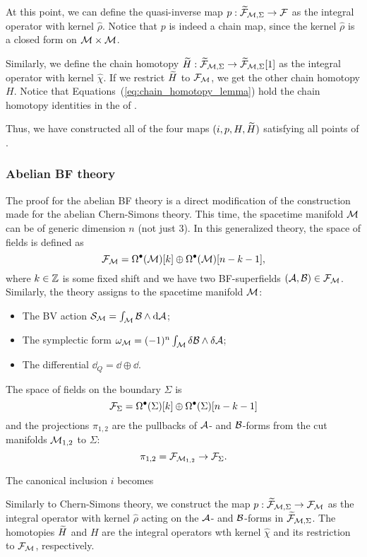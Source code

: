 At this point, we can define the quasi-inverse map $p: \widetilde{\mathcal{F}}_{\mathcal{M}, \Sigma} \rightarrow \mathcal{F}$ as the integral operator with kernel $\hat{\rho}$.
Notice that $p$ is indeed a chain map, since the kernel $\hat{\rho}$ is a closed form on $\mathcal{M} \times \mathcal{M}$.

Similarly, we define the chain homotopy $\widetilde{H} : \widetilde{\mathcal{F}}_{\mathcal{M}, \Sigma} \rightarrow \widetilde{\mathcal{F}}_{\mathcal{M}, \Sigma}[1]$ as the integral operator with kernel $\hat{\chi}$.
If we restrict $\widetilde{H}$ to $\mathcal{F}_{\mathcal{M}}$, we get the other chain homotopy $H$.
Notice that Equations~(\ref{eq:chain_homotopy_lemma}) hold the chain homotopy identities in the  of .

Thus, we have constructed all of the four maps $(i, p, H, \widetilde{H})$ satisfying all points of .

\subsubsection{Abelian BF theory}
\label{subsubsec:abelain_bf_theory}

The proof for the abelian BF theory is a direct modification of the construction made for the abelian Chern-Simons theory.
This time, the spacetime manifold $\mathcal{M}$ can be of generic dimension $n$ (not just 3).
In this generalized theory, the space of fields is defined as
\begin{equation*}
    \mathcal{F}_{\mathcal{M}} = 
    \Omega^\bullet (\mathcal{M})[k] \oplus
    \Omega^\bullet (\mathcal{M})[n-k-1],
\end{equation*}
where $k \in \mathbb{Z}$ is some fixed shift and we have two BF-superfields $(\mathcal{A}, \mathcal{B}) \in \mathcal{F}_{\mathcal{M}}$.
Similarly, the theory assigns to the spacetime manifold $\mathcal{M}$:
\begin{itemize}
    \item The BV action $\mathcal{S}_{\mathcal{M}} = \int_{\mathcal{M}} \mathcal{B} \wedge \dd \mathcal{A}$;
    \item The symplectic form $\omega_{\mathcal{M}} = (-1)^n  \int_{\mathcal{M}} \delta \mathcal{B} \wedge \delta \mathcal{A}$;
    \item The differential $\dd_Q = \dd \oplus \dd$.
\end{itemize}

The space of fields on the boundary $\Sigma$ is
\begin{equation*}
    \mathcal{F}_\Sigma = 
    \Omega^\bullet (\Sigma)[k] \oplus
    \Omega^\bullet (\Sigma)[n-k-1]
\end{equation*}
and the projections $\pi_{1,2}$ are the pullbacks of $\mathcal{A}$- and $\mathcal{B}$-forms from the cut manifolds $\mathcal{M}_{1, 2}$ to $\Sigma$:
\begin{equation*}
    \pi_{1, 2} = \mathcal{F}_{\mathcal{M}_{1, 2}} \rightarrow \mathcal{F}_\Sigma .
\end{equation*}

The canonical inclusion $i$ becomes
\begin{equation*}
    
\end{equation*}

Similarly to Chern-Simons theory, we construct the map $p: \widetilde{\mathcal{F}}_{\mathcal{M}, \Sigma} \rightarrow \mathcal{F}_{\mathcal{M}}$ as the integral operator with kernel $\hat{\rho}$ acting on the $\mathcal{A}$- and $\mathcal{B}$-forms in $\widetilde{\mathcal{F}}_{\mathcal{M}, \Sigma}$.
The homotopies $\widetilde{H}$ and $H$ are the integral operators wth kernel $\hat{\chi}$ and its restriction to $\mathcal{F}_{\mathcal{M}}$, respectively.